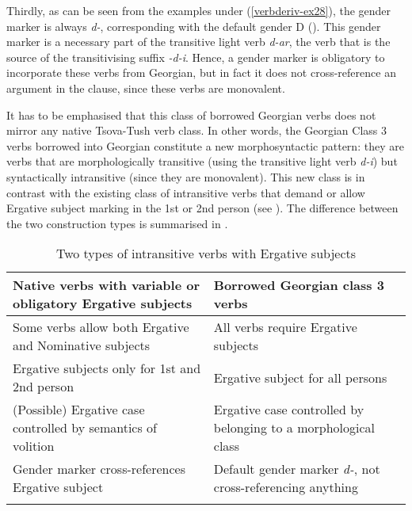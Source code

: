 Thirdly, as can be seen from the examples under (\ref{verbderiv-ex28}), the gender marker is always \textit{d-}, corresponding with the default gender D (). This gender marker is a necessary part of the transitive light verb \textit{d-ar}, the verb that is the source of the transitivising suffix \textit{-d-i}. Hence, a gender marker is obligatory to incorporate these verbs from Georgian, but in fact it does not cross-reference an argument in the clause, since these verbs are monovalent.

It has to be emphasised that this class of borrowed Georgian verbs does not mirror any native Tsova-Tush verb class. In other words, the Georgian Class 3 verbs borrowed into Georgian constitute a new morphosyntactic pattern: they are verbs that are morphologically transitive (using the transitive light verb \textit{d-i}) but syntactically intransitive (since they are monovalent). This new class is in contrast with the existing class of intransitive verbs that demand or allow Ergative subject marking in the 1st or 2nd person (see ). The difference between the two construction types is summarised in .

\begin{table}[hp]
		\begin{tabularx}{\textwidth}{QQ}
        \lsptoprule
			Native verbs with variable or obligatory Ergative subjects & Borrowed Georgian class 3 verbs \\\midrule
			Some verbs allow both Ergative and Nominative subjects & All verbs require Ergative subjects \\\addlinespace
			Ergative subjects only for 1st and 2nd person & Ergative subject for all persons \\\addlinespace
			(Possible) Ergative case controlled by semantics of volition & Ergative case controlled by belonging to a morphological class \\\addlinespace
			Gender marker cross-references Ergative subject & Default gender marker \textit{d-}, not cross-referencing anything \\
		\lspbottomrule
		\end{tabularx}
	\caption{Two types of intransitive verbs with Ergative subjects}
	\label{table-ergintrans}
\end{table}


